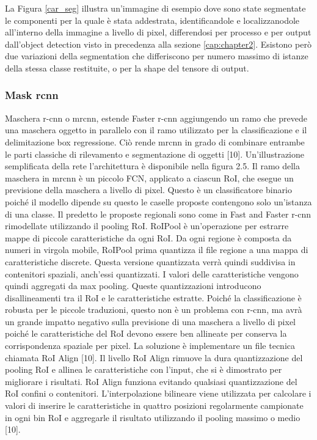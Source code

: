 La Figura \ref{car_seg} illustra un'immagine di esempio dove sono state segmentate le componenti per la quale è stata addestrata, identificandole e localizzanodole all'interno della immagine a livello di pixel, differendosi per processo e per output dall'object detection visto in precedenza alla sezione \ref{cap:chapter2}. Esistono però due variazioni della segmentation che differiscono per numero massimo di istanze della stessa classe restituite, o per la shape del tensore di output.

\subsubsection{Mask rcnn}

Maschera r-cnn o mrcnn, estende Faster r-cnn aggiungendo un ramo che prevede una maschera oggetto in parallelo con il ramo utilizzato per la classificazione e il delimitazione box regressione. Ciò rende mrcnn in grado di combinare entrambe le parti classiche di rilevamento e segmentazione di oggetti [10]. Un'illustrazione semplificata della rete l'architettura è disponibile nella figura 2.5. Il ramo della maschera in mrcnn è un piccolo FCN, applicato a ciascun RoI, che esegue un previsione della maschera a livello di pixel. Questo è un classificatore binario poiché il modello dipende su questo le caselle proposte contengono solo un'istanza di una classe. Il predetto le proposte regionali sono come in Fast and Faster r-cnn rimodellate utilizzando il pooling RoI. RoIPool è un'operazione per estrarre mappe di piccole caratteristiche da ogni RoI. Da ogni regione è composta da numeri in virgola mobile, RoIPool prima quantizza il file regione a una mappa di caratteristiche discrete. Questa versione quantizzata verrà quindi suddivisa in contenitori spaziali, anch'essi quantizzati. I valori delle caratteristiche vengono quindi aggregati da max pooling. Queste quantizzazioni introducono disallineamenti tra il RoI e le caratteristiche estratte. Poiché la classificazione è robusta per le piccole traduzioni, questo non è un problema con r-cnn, ma avrà un grande impatto negativo sulla previsione di una maschera a livello di pixel poiché le caratteristiche del RoI devono essere ben allineate per conserva la corrispondenza spaziale per pixel. La soluzione è implementare un file tecnica chiamata RoI Align [10]. Il livello RoI Align rimuove la dura quantizzazione del pooling RoI e allinea le caratteristiche con l'input, che si è dimostrato per migliorare i risultati. RoI Align funziona evitando qualsiasi quantizzazione del RoI confini o contenitori. L'interpolazione bilineare viene utilizzata per calcolare i valori di inserire le caratteristiche in quattro posizioni regolarmente campionate in ogni bin RoI e aggregarle il risultato utilizzando il pooling massimo o medio [10].

